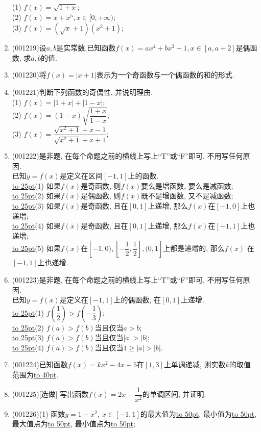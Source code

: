 \documentclass[10pt,a4paper]{article}
\newcommand{\blank}[1]{\underline{\hbox to #1pt{}}}
\begin{document}
\begin{enumerate}[1.]
(1) $f(x)=\sqrt{1+x}$;\\ 
(2) $f(x)=x+x^5,x\in[0,+\infty)$;\\ 
(3) $f(x)=(\sqrt{x}+1)(x^2+1)$;
\item {\tiny (001219)}设$a,b$是实常数,已知函数$f(x)=ax^4+bx^3+1,x\in[a,a+2]$是偶函数, 求$a,b$的值.
\item {\tiny (001220)}将$f(x)=|x+1|$表示为一个奇函数与一个偶函数的和的形式.
\item {\tiny (001221)}判断下列函数的奇偶性, 并说明理由.\\ 
(1) $f(x)=|1+x|+|1-x|$;\\ 
(2) $f(x)=(1-x)\sqrt{\dfrac{1+x}{1-x}}$;\\ 
(3) $f(x)=\dfrac{\sqrt{x^2+1}+x-1}{\sqrt{x^2+1}+x+1}$;
\item {\tiny (001222)}是非题, 在每个命题之前的横线上写上``T''或``F''即可, 不用写任何原因.\\ 
已知$y=f(x)$是定义在区间$[-1,1]$上的函数.\\ 
\blank{25}(1) 如果$f(x)$是奇函数, 则$f(x)$要么是增函数, 要么是减函数;\\ 
\blank{25}(2) 如果$f(x)$是偶函数, 则$f(x)$既不是增函数, 又不是减函数;\\ 
\blank{25}(3) 如果$f(x)$是奇函数, 且在$[0,1]$上递增, 那么$f(x)$在$[-1,0]$上也递增;\\ 
\blank{25}(4) 如果$f(x)$是奇函数, 且在$[0,1]$上递增, 那么$f(x)$在$[-1,1]$上也递增;\\ 
\blank{25}(5) 如果$f(x)$在$[-1,0),[-\dfrac{1}{2},\dfrac{1}{2}],(0,1]$上都是递增的, 那么$f(x)$ 在$[-1,1]$上也递增.
\item {\tiny (001223)}是非题, 在每个命题之前的横线上写上``T''或``F''即可, 不用写任何原因.\\ 
已知$y=f(x)$是定义在$[-1,1]$上的偶函数, 在$[0,1]$上递增.\\ 
\blank{25}(1) $f(\dfrac{1}{2})>f(-\dfrac{1}{3})$;\\ 
\blank{25}(2) $f(a)>f(b)$当且仅当$a>b$;\\ 
\blank{25}(3) $f(a)>f(b)$当且仅当$|a|>|b|$;\\ 
\blank{25}(4) $f(a)>f(b)$当且仅当$1\ge |a|>|b|$.
\item {\tiny (001224)}已知函数$f(x)=kx^2-4x+5$在$[1,3]$上单调递减, 则实数$k$的取值范围为\blank{40}.
\item {\tiny (001225)}[选做]
写出函数$f(x)=2x+\dfrac{1}{x^2}$的单调区间, 并证明.
\item {\tiny (001226)}(1) 函数$y=1-x^2, \ x\in [-1,1]$的最大值为\blank{50}, 最小值为\blank{50}, 最大值点为\blank{50}, 最小值点为\blank{50};\\ 

\end{enumerate}
\end{document}
